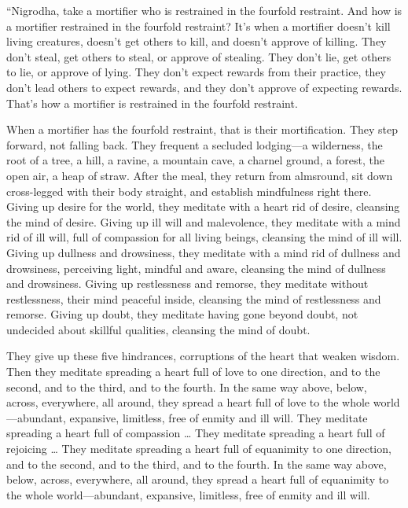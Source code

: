 \documentclass[12pt,openany]{book}%
\begin{document}
“Nigrodha, take a mortifier who is restrained in the fourfold restraint. And how is a mortifier restrained in the fourfold restraint? It’s when a mortifier doesn’t kill living creatures, doesn’t get others to kill, and doesn’t approve of killing. They don’t steal, get others to steal, or approve of stealing. They don’t lie, get others to lie, or approve of lying. They don’t expect rewards from their practice, they don’t lead others to expect rewards, and they don’t approve of expecting rewards. That’s how a mortifier is restrained in the fourfold restraint. 

When a mortifier has the fourfold restraint, that is their mortification. They step forward, not falling back. They frequent a secluded lodging—a wilderness, the root of a tree, a hill, a ravine, a mountain cave, a charnel ground, a forest, the open air, a heap of straw. After the meal, they return from almsround, sit down cross-legged with their body straight, and establish mindfulness right there. Giving up desire for the world, they meditate with a heart rid of desire, cleansing the mind of desire. Giving up ill will and malevolence, they meditate with a mind rid of ill will, full of compassion for all living beings, cleansing the mind of ill will. Giving up dullness and drowsiness, they meditate with a mind rid of dullness and drowsiness, perceiving light, mindful and aware, cleansing the mind of dullness and drowsiness. Giving up restlessness and remorse, they meditate without restlessness, their mind peaceful inside, cleansing the mind of restlessness and remorse. Giving up doubt, they meditate having gone beyond doubt, not undecided about skillful qualities, cleansing the mind of doubt. 

They give up these five hindrances, corruptions of the heart that weaken wisdom. Then they meditate spreading a heart full of love to one direction, and to the second, and to the third, and to the fourth. In the same way above, below, across, everywhere, all around, they spread a heart full of love to the whole world—abundant, expansive, limitless, free of enmity and ill will. They meditate spreading a heart full of compassion … They meditate spreading a heart full of rejoicing … They meditate spreading a heart full of equanimity to one direction, and to the second, and to the third, and to the fourth. In the same way above, below, across, everywhere, all around, they spread a heart full of equanimity to the whole world—abundant, expansive, limitless, free of enmity and ill will. 
\end{document}

